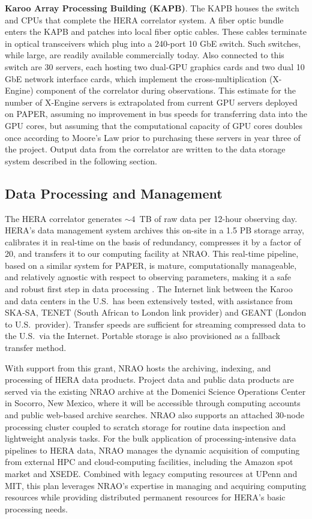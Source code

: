 \documentclass[preprint,11pt]{aastex}
\begin{document}
{\bf Karoo Array Processing Building (KAPB)}.
The KAPB houses the switch and CPUs
that 
complete the HERA correlator system.  A fiber optic bundle enters the KAPB and patches
into local fiber optic cables. These cables terminate in optical transceivers which plug into a 240-port 10 GbE switch.
Such switches, while large, are readily available commercially today.  Also connected to
this switch are 30 servers, each hosting two dual-GPU graphics cards and two dual
10 GbE network interface cards, which implement the cross-multiplication (X-Engine) component
of the correlator during observations.  This estimate for the number of X-Engine servers
is extrapolated from current GPU servers deployed on PAPER, assuming no improvement in bus
speeds for transferring data into the GPU cores, but assuming that the computational
capacity of GPU cores doubles once according to Moore's Law prior to purchasing
these servers in year three of the project.
Output data from the correlator are written to the data storage system described
in the following section.

\subsection{Data Processing and Management}
\label{sec:data}
\noindent The HERA correlator generates $\sim4$~TB of raw data per 12-hour observing day.
HERA's data management system archives this on-site in a 1.5 PB storage array, calibrates it in real-time
on the basis of redundancy, compresses it by a factor of 20, and transfers it to our computing facility at NRAO.
This real-time pipeline, based on a similar system for PAPER, is mature, computationally manageable, and 
relatively agnostic with respect to observing parameters, making it a safe and robust first step in data processing
\citep{zheng_et_al2014,parsons_etal2014,ali_et_al2015}.
The Internet link between the Karoo and data centers in the U.S.\ has been extensively tested, with assistance from SKA-SA, TENET
(South African to London link provider) and GEANT (London to U.S.\ provider).   
Transfer speeds are sufficient for streaming compressed data to the U.S.\ via the Internet. Portable storage is also
provisioned as a fallback transfer method.

With support from this grant, NRAO hosts the archiving, indexing, and processing of HERA data products. 
Project data and public data products are served via the existing 
NRAO archive at the Domenici Science Operations Center %
in Socorro, New Mexico, where it will be accessible through computing accounts and public web-based
archive searches.
NRAO also supports
an attached 30-node processing cluster 
coupled to 
scratch storage
for routine data inspection and lightweight analysis tasks.
For the bulk application of processing-intensive data pipelines to HERA data,
NRAO manages the dynamic acquisition of computing from
external HPC and cloud-computing facilities, including the Amazon spot market and XSEDE. 
Combined with legacy computing resources at UPenn and MIT, this plan leverages NRAO's
expertise in managing and acquiring computing resources while providing distributed
permanent resources for HERA's basic processing needs.
\end{document}
